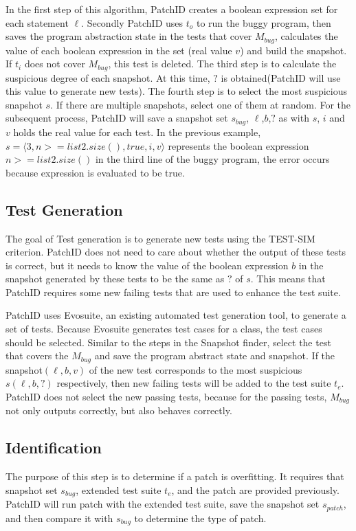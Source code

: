 In the first step of this algorithm, PatchID creates a boolean expression set for each statement $\ell$. Secondly PatchID uses $t_o$ to run the buggy program, then saves the program abstraction state in the tests that cover $M_{bug}$, calculates the value of each boolean expression in the set (real value $v$) and build the snapshot. If $t_i$ does not cover $M_{bug}$, this test is deleted. The third step is to calculate the suspicious degree of each snapshot. At this time, $?$ is obtained(PatchID will use this value to generate new tests). The fourth step is to select the most suspicious snapshot $s$. If there are multiple snapshots, select one of them at random. For the subsequent process, PatchID will save a snapshot set $s_{bug}$, $\ell$,$b$,$?$ as with $s$, $i$ and $v$ holds the real value for each test. In the previous example, $s= \langle 3,n>=list2.size(),true,i,v \rangle$ represents the boolean expression $n>=list2.size()$ in the third line of the buggy program, the error occurs because expression is evaluated to be true.
\subsection{Test Generation}\label{4.3}
The goal of Test generation is to generate new tests using the TEST-SIM criterion. PatchID does not need to care about whether the output of these tests is correct, but it needs to know the value of the boolean expression $b$ in the snapshot generated by these tests to be the same as $?$ of $s$. This means that PatchID requires some new failing tests that are used to enhance the test suite.

PatchID uses Evosuite\cite{ref58}, an existing automated test generation tool, to generate a set of tests. Because Evosuite generates test cases for a class, the test cases should be selected. Similar to the steps in the Snapshot finder, select the test that covers the $M_{bug}$ and save the program abstract state and snapshot. If the snapshot$(\ell,b,v)$ of the new test corresponds to the most suspicious $s(\ell,b,?)$ respectively, then new failing tests will be added to the test suite $t_e$. PatchID does not select the new passing tests, because for the passing tests, $M_{bug}$ not only outputs correctly, but also behaves correctly.

\subsection{Identification}\label{4.4}
The purpose of this step is to determine if a patch is overfitting. It requires that snapshot set $s_{bug}$, extended test suite $t_e$, and the patch are provided previously. PatchID will run patch with the extended test suite, save the snapshot set $s_{patch}$, and then compare it with $s_{bug}$ to determine the type of patch.

